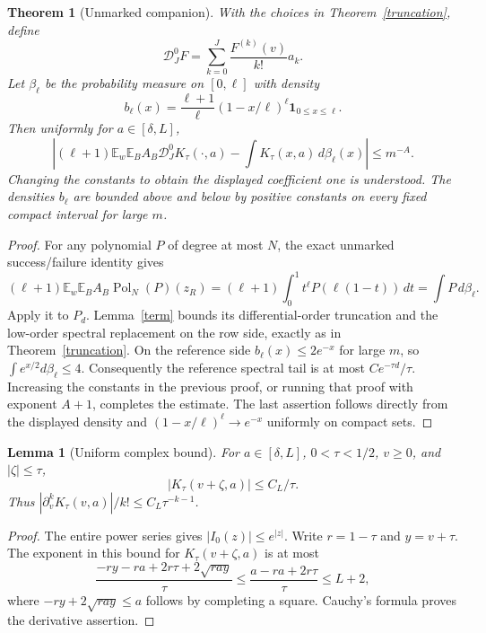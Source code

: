\documentclass[11pt]{article}
\newtheorem{lemma}{Lemma}\newtheorem{theorem}{Theorem}
\newcommand{\E}{\mathbb E}
\begin{document}
\begin{theorem}[Unmarked companion]\label{unmarked}
With the choices in Theorem~\ref{truncation}, define
\[
 \mathcal D_J^0F=\sum_{k=0}^J\frac{F^{(k)}(v)}{k!}a_k.
\]
Let $\beta_\ell$ be the probability measure on $[0,\ell]$ with density
\[
 b_\ell(x)=\frac{\ell+1}{\ell}
             (1-x/\ell)^\ell\boldsymbol1_{0\le x\le\ell}.
\]
Then uniformly for $a\in[\delta,L]$,
\[
 \left|(\ell+1)\E_w\E_BA_B\mathcal D_J^0K_\tau(\cdot,a)
                       -\int K_\tau(x,a)\,d\beta_\ell(x)\right|
 \le m^{-A}.
\]
Changing the constants to obtain the displayed coefficient one is
understood. The densities $b_\ell$ are bounded above and below by
positive constants on every fixed compact interval for large $m$.
\end{theorem}
\begin{proof}
For any polynomial $P$ of degree at most $N$, the exact unmarked
success/failure identity gives
\[
 (\ell+1)\E_w\E_B A_B\operatorname{Pol}_N(P)(z_R)
       =(\ell+1)\int_0^1t^\ell P(\ell(1-t))\,dt
       =\int P\,d\beta_\ell.
\]
Apply it to $P_d$. Lemma~\ref{term} bounds its differential-order
truncation and the low-order spectral replacement on the row side,
exactly as in Theorem~\ref{truncation}.
On the reference side $b_\ell(x)\le2e^{-x}$ for large $m$, so
$\int e^{x/2}d\beta_\ell\le4$. Consequently the reference spectral
tail is at most $Ce^{-\tau d}/\tau$. Increasing the constants in the
previous proof, or running that proof with exponent $A+1$, completes
the estimate. The last assertion follows directly from the displayed
density and $(1-x/\ell)^\ell\to e^{-x}$ uniformly on compact sets.
\end{proof}

\begin{lemma}[Uniform complex bound]\label{complexglobal}
For $a\in[\delta,L]$, $0<\tau<1/2$, $v\ge0$, and $|\zeta|\le\tau$,
\[
 |K_\tau(v+\zeta,a)|\le C_L/\tau.
\]
Thus $|\partial_v^kK_\tau(v,a)|/k!\le C_L\tau^{-k-1}$.
\end{lemma}
\begin{proof}
The entire power series gives $|I_0(z)|\le e^{|z|}$.
Write $r=1-\tau$ and $y=v+\tau$. The exponent in this bound for
$K_\tau(v+\zeta,a)$ is at most
\[
 \frac{-ry-ra+2r\tau+2\sqrt{ray}}\tau
 \le\frac{a-ra+2r\tau}\tau\le L+2,
\]
where $-ry+2\sqrt{ray}\le a$ follows by completing a square.
Cauchy's formula proves the derivative assertion.
\end{proof}
\end{document}
